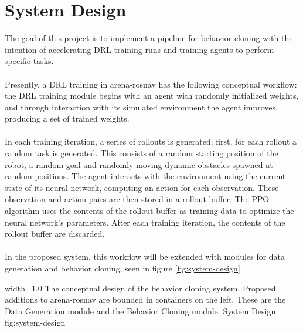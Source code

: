 \section{System Design}
The goal of this project is to implement a pipeline for behavior cloning with the intention of accelerating DRL training runs and training agents to perform specific tasks.
\\\\\noindent 
Presently, a DRL training in arena-rosnav has the following conceptual workflow: the DRL training module begins with an agent with randomly initialized weights, and through interaction with its simulated environment the agent improves, producing a set of trained weights.
\\\\\noindent 
In each training iteration, a series of rollouts is generated: first, for each rollout a random task is generated. This consists of a random starting position of the robot, a random goal and randomly moving dynamic obstacles spawned at random positions. The agent interacts with the environment using the current state of its neural network, computing an action for each observation. These observation and action pairs are then stored in a rollout buffer. The PPO algorithm uses the contents of the rollout buffer as training data to optimize the neural network’s parameters. After each training iteration, the contents of the rollout buffer are discarded.
\\\\\noindent 
In the proposed system, this workflow will be extended with modules for data generation and behavior cloning, seen in figure \ref{fig:system-design}.

 {width=1.0\textwidth}%
 {The conceptual design of the behavior cloning system. Proposed additions to arena-rosnav are bounded in containers on the left. These are the Data Generation module and the Behavior Cloning module.}%
 {System Design}%
 {fig:system-design}%
 \FloatBarrier
 
